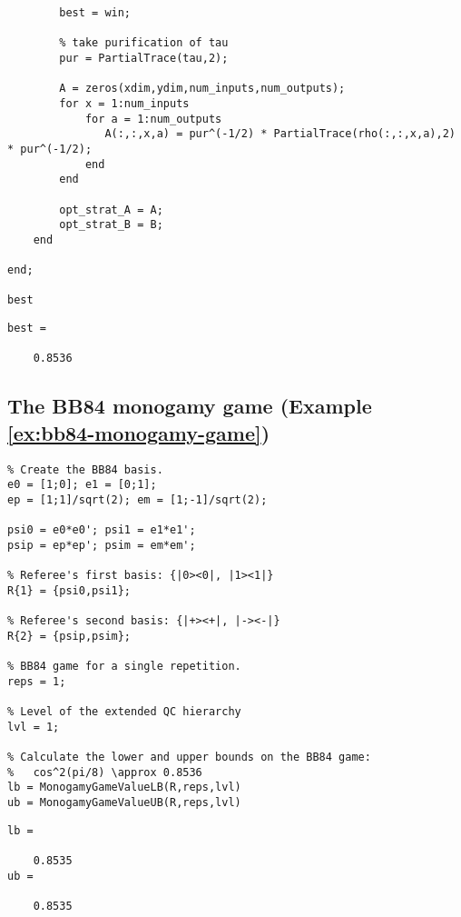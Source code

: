 \begin{verbatim}
        best = win;

        % take purification of tau
        pur = PartialTrace(tau,2);            

        A = zeros(xdim,ydim,num_inputs,num_outputs); 
        for x = 1:num_inputs
            for a = 1:num_outputs
               A(:,:,x,a) = pur^(-1/2) * PartialTrace(rho(:,:,x,a),2) * pur^(-1/2); 
            end
        end
         
        opt_strat_A = A;
        opt_strat_B = B;
    end

end;
 
best
\end{verbatim}
\color{lightgray} 
\begin{verbatim}     
best =

    0.8536
\end{verbatim}
\color{black}

\subsection{The BB84 monogamy game (Example \ref{ex:bb84-monogamy-game})} \label{code:bb84-game}

\begin{verbatim}
% Create the BB84 basis.
e0 = [1;0]; e1 = [0;1];
ep = [1;1]/sqrt(2); em = [1;-1]/sqrt(2); 

psi0 = e0*e0'; psi1 = e1*e1';
psip = ep*ep'; psim = em*em'; 

% Referee's first basis: {|0><0|, |1><1|}
R{1} = {psi0,psi1};

% Referee's second basis: {|+><+|, |-><-|}
R{2} = {psip,psim};

% BB84 game for a single repetition.
reps = 1; 

% Level of the extended QC hierarchy 
lvl = 1;

% Calculate the lower and upper bounds on the BB84 game:
%   cos^2(pi/8) \approx 0.8536
lb = MonogamyGameValueLB(R,reps,lvl)
ub = MonogamyGameValueUB(R,reps,lvl)
\end{verbatim}\color{lightgray} 
\begin{verbatim}     
lb =

    0.8535
ub =

    0.8535
\end{verbatim}
\color{black}

